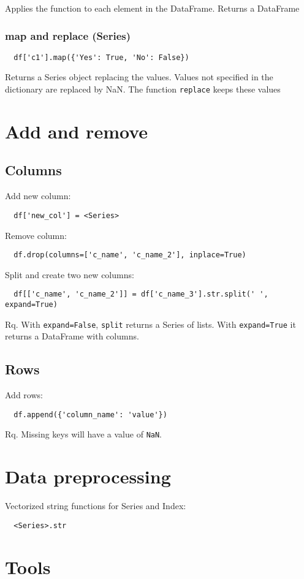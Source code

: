 \documentclass[french]{article}
\begin{document}
Applies the function to each element in the DataFrame. Returns a DataFrame

\subsubsection{map and replace (Series)}
\begin{lstlisting}
  df['c1'].map({'Yes': True, 'No': False})
\end{lstlisting}
Returns a Series object replacing the values. Values not specified in the dictionary are replaced by NaN. The function \verb|replace| keeps these values

\section{Add and remove}

\subsection{Columns}

Add new column:
\begin{lstlisting}
  df['new_col'] = <Series>
\end{lstlisting}

Remove column:
\begin{lstlisting}
  df.drop(columns=['c_name', 'c_name_2'], inplace=True)
\end{lstlisting}

Split and create two new columns:
\begin{lstlisting}
  df[['c_name', 'c_name_2']] = df['c_name_3'].str.split(' ', expand=True)
\end{lstlisting}
Rq. With \verb|expand=False|, \verb|split| returns a Series of lists. With \verb|expand=True| it returns a DataFrame with columns.

\subsection{Rows}

Add rows:
\begin{lstlisting}
  df.append({'column_name': 'value'})
\end{lstlisting}
Rq. Missing keys will have a value of \verb|NaN|.


\section{Data preprocessing}

Vectorized string functions for Series and Index:
\begin{lstlisting}
  <Series>.str
\end{lstlisting}

\section{Tools}
\end{document}
